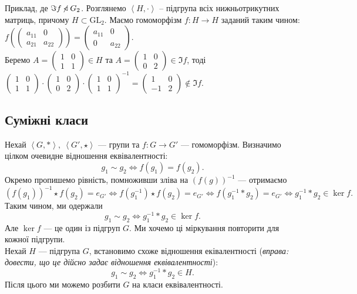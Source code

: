 \documentclass{math_library}
\begin{document}
\begin{example}
Приклад, де $\Im f \centernot\triangleleft G_2$. Розглянемо $\left<H, \cdot \right>$ -- підгрупа всіх нижньотрикутних матриць, причому $H \subset \mathrm{GL}_2$. Маємо гомоморфізм $f \colon H \to H$ заданий таким чином:\\
$f\left( \begin{pmatrix}
a_{11} & 0 \\
a_{21} & a_{22}
\end{pmatrix} \right) = \begin{pmatrix}
a_{11} & 0 \\
0 & a_{22}
\end{pmatrix}$.\\
Беремо $A = \begin{pmatrix}
1 & 0 \\
1 & 1
\end{pmatrix} \in H$ та $A = \begin{pmatrix}
1 & 0 \\
0 & 2
\end{pmatrix} \in \Im f$, тоді\\
$\begin{pmatrix}
1 & 0 \\
1 & 1
\end{pmatrix} \cdot \begin{pmatrix}
1 & 0 \\
0 & 2
\end{pmatrix} \cdot \begin{pmatrix}
1 & 0 \\
1 & 1
\end{pmatrix}^{-1} = \begin{pmatrix}
1 & 0 \\
-1 & 2
\end{pmatrix} \not \in \Im f$.
\end{example}
\fi

\subsection{Суміжні класи}
Нехай $\left< G, *\right>,\ \left< G', \star \right>$ --- групи та $f \colon G \to G'$ --- гомоморфізм. Визначимо цілком очевидне відношення еквівалентності: 
\[
g_1 \sim g_2 \iff f(g_1) = f(g_2).
\]
Окремо пропишемо рівність, помноживши зліва на $(f(g))^{-1}$ --- отримаємо \[
(f(g_1))^{-1} \star f(g_2) = e_{G'} \iff f(g_1^{-1}) \star f(g_2) = e_{G'} \iff f(g_1^{-1}*g_2) = e_{G'} \iff g_1^{-1}*g_2 \in \ker f.
\]
Таким чином, ми одержали
\[
g_1 \sim g_2 \iff g_1^{-1}*g_2 \in \ker f.
\]
Але $\ker f$ --- це один із підгруп $G$. Ми хочемо ці міркування повторити для кожної підгрупи.
\bigskip \\
Нехай $H$ --- підгрупа $G$, встановимо схоже відношення еківалентності (\textit{вправа: довести, що це дійсно задає відношення еквівалентності}):
\[
g_1 \sim g_2 \iff g_1^{-1}*g_2 \in H.
\]
Після цього ми можемо розбити $G$ на класи еквівалентності.
\end{document}

